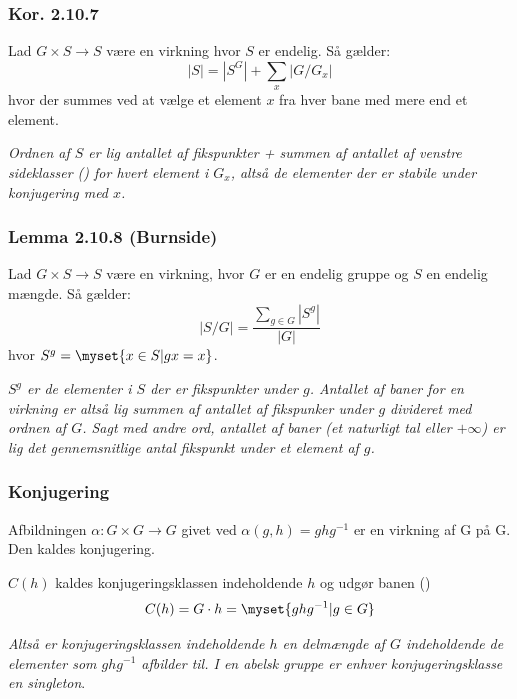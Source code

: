 \subsubsection{Kor. 2.10.7}
\label{2.10.7}
Lad $G \times S \rightarrow S$ være en virkning hvor $S$ er endelig. Så gælder:
\begin{equation*}
  |S| = |S^G| + \sum_x |G/G_x|
\end{equation*}
hvor der summes ved at vælge et element $x$ fra hver bane med mere end et
element.

\textit{Ordnen af $S$ er lig antallet af fikspunkter + summen af antallet af
venstre sideklasser () for hvert element i $G_x$, altså de
elementer der er stabile under konjugering med $x$.}

\subsubsection{Lemma 2.10.8 (Burnside)}
Lad $G \times S \rightarrow S$ være en virkning, hvor $G$ er en endelig gruppe
og $S$ en endelig mængde. Så gælder:
\begin{equation*}
  |S/G| = \frac{\sum_{g \in G}|S^g|}{|G|}
\end{equation*}
hvor $S^g = \myset{x \in S| gx = x}$.

\textit{$S^g$ er de elementer i $S$ der er fikspunkter under $g$. Antallet af
baner for en virkning er altså lig summen af antallet af fikspunker under $g$
divideret med ordnen af $G$. Sagt med andre ord, antallet af baner (et
naturligt tal eller $+\infty$) er lig det gennemsnitlige antal fikspunkt under
et element af $g$.}

\subsubsection{Konjugering}
\label{konj}
Afbildningen $\alpha: G \times G \rightarrow G$ givet ved $\alpha(g,h) =
ghg^{-1}$ er en virkning af G på G. Den kaldes konjugering.

$C(h)$ kaldes konjugeringsklassen indeholdende $h$ og udgør banen () 
\begin{equation*}
  C(h) = G \cdot h = \myset{ghg^{-1}|g\in G}
\end{equation*}

\textit{Altså er konjugeringsklassen indeholdende $h$ en delmængde af $G$
indeholdende de elementer som $ghg^{-1}$ afbilder til. I en abelsk gruppe er
enhver konjugeringsklasse en singleton}.

